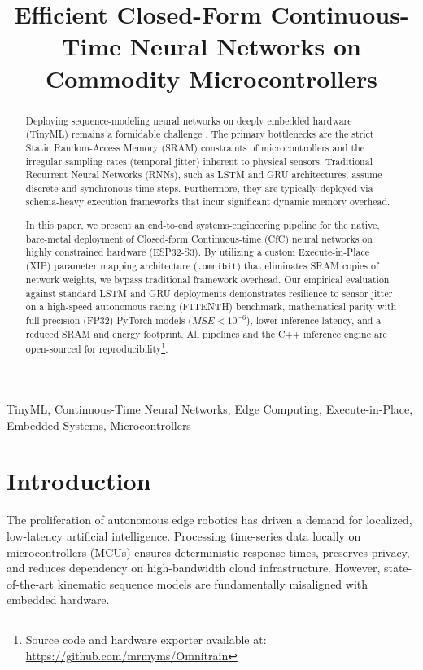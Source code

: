\documentclass[conference]{IEEEtran}
\begin{document}
\title{Efficient Closed-Form Continuous-Time Neural Networks on Commodity Microcontrollers}

\author{
}

\maketitle

\begin{abstract}
Deploying sequence-modeling neural networks on deeply embedded hardware (TinyML) remains a formidable challenge \cite{ji2020tinyml, gao2021tinytl}. The primary bottlenecks are the strict Static Random-Access Memory (SRAM) constraints of microcontrollers and the irregular sampling rates (temporal jitter) inherent to physical sensors. Traditional Recurrent Neural Networks (RNNs), such as LSTM \cite{hochreiter1997long} and GRU \cite{cho2014learning} architectures, assume discrete and synchronous time steps. Furthermore, they are typically deployed via schema-heavy execution frameworks that incur significant dynamic memory overhead. 

In this paper, we present an end-to-end systems-engineering pipeline for the native, bare-metal deployment of Closed-form Continuous-time (CfC) neural networks on highly constrained hardware (ESP32-S3). By utilizing a custom Execute-in-Place (XIP) parameter mapping architecture (\texttt{.omnibit}) that eliminates SRAM copies of network weights, we bypass traditional framework overhead. Our empirical evaluation against standard LSTM and GRU deployments demonstrates resilience to sensor jitter on a high-speed autonomous racing (F1TENTH) benchmark, mathematical parity with full-precision (FP32) PyTorch models ($MSE < 10^{-6}$), lower inference latency, and a reduced SRAM and energy footprint. All pipelines and the C++ inference engine are open-sourced for reproducibility\footnote{Source code and hardware exporter available at: \url{https://github.com/mrmyms/Omnitrain}}.
\end{abstract}

\begin{IEEEkeywords}
TinyML, Continuous-Time Neural Networks, Edge Computing, Execute-in-Place, Embedded Systems, Microcontrollers
\end{IEEEkeywords}

\section{Introduction}
The proliferation of autonomous edge robotics has driven a demand for localized, low-latency artificial intelligence. Processing time-series data locally on microcontrollers (MCUs) ensures deterministic response times, preserves privacy, and reduces dependency on high-bandwidth cloud infrastructure. However, state-of-the-art kinematic sequence models are fundamentally misaligned with embedded hardware.
\end{document}
